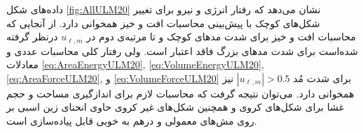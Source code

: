 داده‌های شکل 
\ref{fig:AllULM20}
نشان می‌دهد که رفتار انرژی و نیرو برای تغییر شکل‌های کوچک با پیش‌بینی محاسبات افت و خیز همخوانی دارد. از آنجایی که محاسبات افت و خیز برای شدت مد‌های کوچک و تا مرتبه‌ی دوم در 
$u_{\ell,m}$
درنظر گرفته شده‌است برای شدت‌ مد‌های بزرگ فاقد اعتبار است. ولی رفتار کلی محاسبات عددی و معادلات
\ref{eq:AreaEnergyULM20}, \ref{eq:VolumeEnergyULM20}, \ref{eq:AreaForceULM20}, 
 و
\ref{eq:VolumeForceULM20}
برای شد‌ت مُد 
$|u_{\ell,m}|>0.5$
نیز همخوانی دارد. می‌توان نتیجه گرفت که محاسبات لازم برای اندازگیری مساحت و حجم غشا برای شکل‌های کروی و همچنین شکل‌های غیر کروی حاوی انحنای زین اسبی بر روی مش‌های معمولی  و  درهم به خوبی قابل پیاده‌سازی است.










